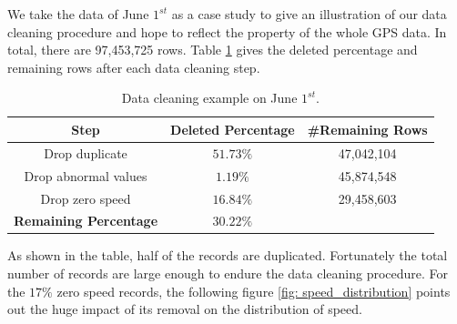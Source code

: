 We take the data of June $1^{st}$ as a case study to give an illustration of our data cleaning procedure and hope to reflect the property of the whole GPS data. In total, there are 97,453,725 rows. Table \ref{data_cleaning_table} gives the deleted percentage and remaining rows after each data cleaning step.

\begin{table}[htb]
  \begin{center}
      \caption{Data cleaning example on June $1^{st}$.}
      \label{data_cleaning_table}
      \begin{tabular}{ccc}
          \toprule

          \textbf{Step} & \textbf{Deleted Percentage} & \textbf{\#Remaining Rows}\\

          \midrule

          Drop duplicate & $51.73\%$ & 47,042,104\\
          Drop abnormal values & $1.19\%$ & 45,874,548\\
          Drop zero speed & $16.84\%$ & 29,458,603\\

          \cmidrule{1-2}

          \textbf{Remaining Percentage} & $30.22\%$ & ~\\

          \bottomrule
      \end{tabular}
  \end{center}
\end{table}

As shown in the table, half of the records are duplicated. Fortunately the total number of records are large enough to endure the data cleaning procedure. For the $17\%$ zero speed records, the following figure \ref{fig: speed_distribution} points out the huge impact of its removal on the distribution of speed.

